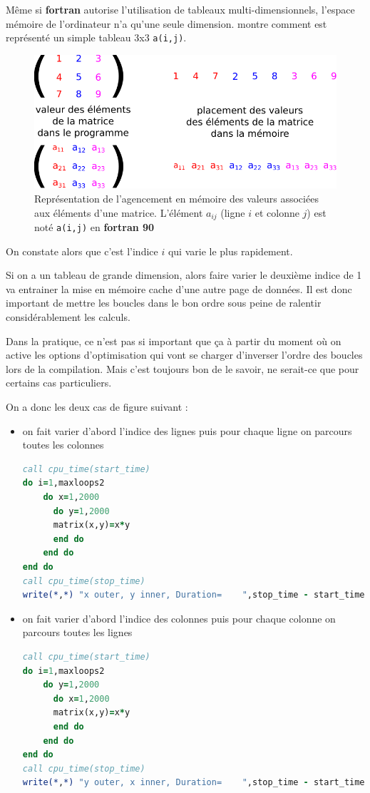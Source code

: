 \documentclass[a4paper,twoside]{article}
\begin{document}
Même si \textbf{fortran} autorise l'utilisation de tableaux multi-dimensionnels, l'espace mémoire de l'ordinateur n'a qu'une seule dimension.  montre comment est représenté un simple tableau 3x3 \texttt{a(i,j)}.

\begin{figure}[htb]
\centering
\includegraphics[width=0.65\linewidth]{figure/array_indices.pdf}
\caption{Représentation de l'agencement en mémoire des valeurs associées aux éléments d'une matrice. L'élément $a_{ij}$ (ligne $i$ et colonne $j$) est noté \texttt{a(i,j)} en \textbf{fortran 90}}\label{fig:array_indices}
\end{figure}

On constate alors que c'est l'indice $i$ qui varie le plus rapidement. 

Si on a un tableau de grande dimension, alors faire varier le deuxième indice de 1 va entrainer la mise en mémoire cache d'une autre page de données. Il est donc important de mettre les boucles dans le bon ordre sous peine de ralentir considérablement les calculs. 

\begin{remarque}
Dans la pratique, ce n'est pas si important que ça à partir du moment où on active les options d'optimisation qui vont se charger d'inverser l'ordre des boucles lors de la compilation. Mais c'est toujours bon de le savoir, ne serait-ce que pour certains cas particuliers.
\end{remarque}

On a donc les deux cas de figure suivant : 
\begin{itemize}
\item on fait varier d'abord l'indice des lignes puis pour chaque ligne on parcours toutes les colonnes
\begin{lstlisting}[language=Fortran]
call cpu_time(start_time)
do i=1,maxloops2
    do x=1,2000
      do y=1,2000
	  matrix(x,y)=x*y
      end do
    end do
end do
call cpu_time(stop_time)
write(*,*) "x outer, y inner, Duration=    ",stop_time - start_time
\end{lstlisting}

\item on fait varier d'abord l'indice des colonnes puis pour chaque colonne on parcours toutes les lignes
\begin{lstlisting}[language=Fortran]
call cpu_time(start_time)
do i=1,maxloops2
    do y=1,2000
      do x=1,2000
	  matrix(x,y)=x*y
      end do
    end do
end do
call cpu_time(stop_time)
write(*,*) "y outer, x inner, Duration=    ",stop_time - start_time
\end{lstlisting}
\end{itemize}
\end{document}
